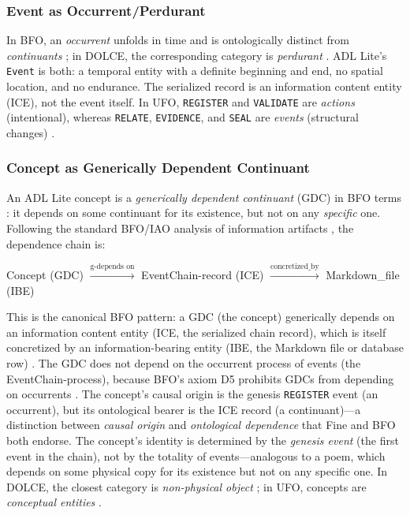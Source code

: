 \subsubsection{Event as Occurrent/Perdurant}

In BFO, an \emph{occurrent} unfolds in time and is ontologically distinct from \emph{continuants} \cite{bfo}; in DOLCE, the corresponding category is \emph{perdurant} \cite{dolce}. ADL Lite's \texttt{Event} is both: a temporal entity with a definite beginning and end, no spatial location, and no endurance. The serialized record is an information content entity (ICE), not the event itself. In UFO, \texttt{REGISTER} and \texttt{VALIDATE} are \emph{actions} (intentional), whereas \texttt{RELATE}, \texttt{EVIDENCE}, and \texttt{SEAL} are \emph{events} (structural changes) \cite{ufo}.

\subsubsection{Concept as Generically Dependent Continuant}

An ADL Lite concept is a \emph{generically dependent continuant} (GDC) in BFO terms \cite{bfo}: it depends on some continuant for its existence, but not on any \emph{specific} one. Following the standard BFO/IAO analysis of information artifacts \cite{iao,smith2012ontology}, the dependence chain is:

\begin{center}
\textsf{Concept} (GDC) $\xrightarrow{\text{g-depends on}}$ \textsf{EventChain-record} (ICE) $\xrightarrow{\text{concretized\_by}}$ \textsf{Markdown\_file} (IBE)
\end{center}

This is the canonical BFO pattern: a GDC (the concept) generically depends on an information content entity (ICE, the serialized chain record), which is itself concretized by an information-bearing entity (IBE, the Markdown file or database row) \cite{smith2012ontology,limbaugh2024cyber}. The GDC does not depend on the occurrent process of events (the EventChain-process), because BFO's axiom D5 prohibits GDCs from depending on occurrents \cite{bfo}. The concept's causal origin is the genesis \texttt{REGISTER} event (an occurrent), but its ontological bearer is the ICE record (a continuant)---a distinction between \emph{causal origin} and \emph{ontological dependence} that Fine \cite{fine1995ontologicaldependence} and BFO both endorse. The concept's identity is determined by the \emph{genesis event} (the first event in the chain), not by the totality of events---analogous to a poem, which depends on some physical copy for its existence but not on any specific one. In DOLCE, the closest category is \emph{non-physical object} \cite{dolce}; in UFO, concepts are \emph{conceptual entities} \cite{ufo}.

